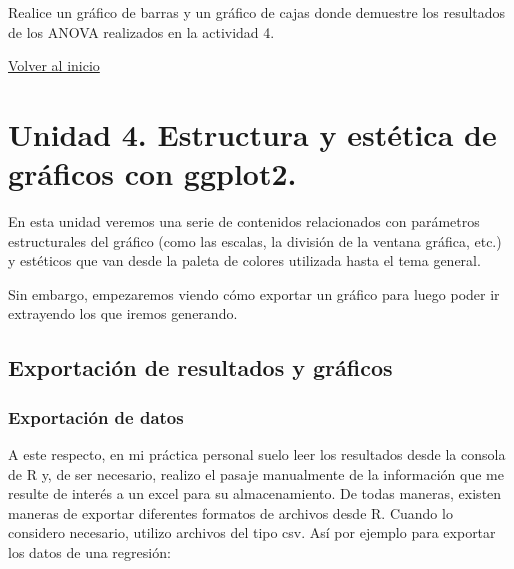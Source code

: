 \documentclass[
  letterpaper,
  DIV=11,
  numbers=noendperiod]{scrartcl}
\newenvironment{Shaded}{\begin{snugshade}}{\end{snugshade}}
\newcommand{\CommentTok}[1]{\textcolor[rgb]{0.37,0.37,0.37}{#1}}
\newcommand{\FunctionTok}[1]{\textcolor[rgb]{0.28,0.35,0.67}{#1}}
\newcommand{\NormalTok}[1]{\textcolor[rgb]{0.00,0.23,0.31}{#1}}
\newcommand{\OtherTok}[1]{\textcolor[rgb]{0.00,0.23,0.31}{#1}}
\newcommand{\SpecialCharTok}[1]{\textcolor[rgb]{0.37,0.37,0.37}{#1}}
\newcommand{\StringTok}[1]{\textcolor[rgb]{0.13,0.47,0.30}{#1}}
\begin{document}
Realice un gráfico de barras y un gráfico de cajas donde demuestre los
resultados de los ANOVA realizados en la actividad 4.

\href{../}{Volver al inicio}

\hypertarget{unidad-4.-estructura-y-estuxe9tica-de-gruxe1ficos-con-ggplot2.}{%
\section{Unidad 4. Estructura y estética de gráficos con
ggplot2.}\label{unidad-4.-estructura-y-estuxe9tica-de-gruxe1ficos-con-ggplot2.}}

En esta unidad veremos una serie de contenidos relacionados con
parámetros estructurales del gráfico (como las escalas, la división de
la ventana gráfica, etc.) y estéticos que van desde la paleta de colores
utilizada hasta el tema general.

Sin embargo, empezaremos viendo cómo exportar un gráfico para luego
poder ir extrayendo los que iremos generando.

\hypertarget{exportaciuxf3n-de-resultados-y-gruxe1ficos}{%
\subsection{Exportación de resultados y
gráficos}\label{exportaciuxf3n-de-resultados-y-gruxe1ficos}}

\hypertarget{exportaciuxf3n-de-datos}{%
\subsubsection{Exportación de datos}\label{exportaciuxf3n-de-datos}}

A este respecto, en mi práctica personal suelo leer los resultados desde
la consola de R y, de ser necesario, realizo el pasaje manualmente de la
información que me resulte de interés a un excel para su almacenamiento.
De todas maneras, existen maneras de exportar diferentes formatos de
archivos desde R. Cuando lo considero necesario, utilizo archivos del
tipo csv. Así por ejemplo para exportar los datos de una regresión:

\begin{Shaded}
\end{Shaded}
\end{document}
